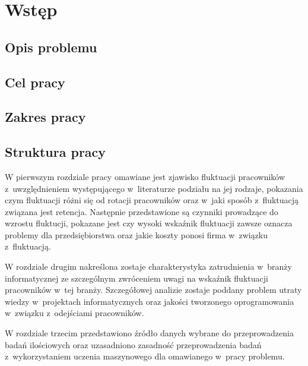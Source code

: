 
\chapter*{Wstęp}\label{ch:admission}

\section*{Opis problemu}\label{sec:admission:problem-description}

\section*{Cel pracy}\label{sec:admission:thesis-goal}


\section*{Zakres pracy}\label{sec:admission:scope-of-work}


\section*{Struktura pracy}\label{sec:admission:thesis-structure}

W pierwszym rozdziale pracy omawiane jest zjawisko fluktuacji pracowników z~uwzględnieniem występującego w~literaturze podziału na jej rodzaje,
pokazania czym fluktuacji różni się od rotacji pracowników oraz w~jaki sposób z~fluktuacją związana jest retencja.
Następnie przedstawione są czynniki prowadzące do wzrostu fluktucji, pokazane jest czy wysoki wskaźnik fluktuacji zawsze oznacza problemy dla przedsiębiorstwa
oraz jakie koszty ponosi firma w~związku z~fluktuacją.

W rozdziale drugim nakreślona zostaje charakterystyka zatrudnienia w~branży informatycznej ze szczególnym zwróceniem uwagi na wskaźnik fluktuacji pracowników w~tej branży.
Szczegółowej analizie zostaje poddany problem utraty wiedzy w~projektach informatycznych oraz jakości tworzonego oprogramowania w~związku z~odejściami pracowników.

W rozdziale trzecim przedstawiono źródło danych wybrane do przeprowadzenia badań ilościowych
oraz uzasadniono zasadność przeprowadzenia badań z~wykorzystaniem uczenia maszynowego dla omawianego w~pracy problemu.

\thispagestyle{normal}
